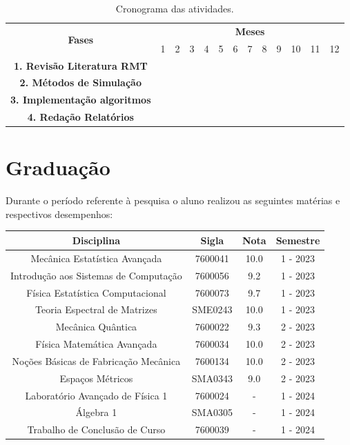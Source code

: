 \documentclass[12pt]{report}
\begin{document}
\begin{table}[ht]
	\centering
	\begin{tabular}{|c|c|c|c|c|c|c|c|c|c|c|c|c|}
		\hline
		\multirow{2}{*}{{\bf Fases}} & \multicolumn{12}{c|}{{\bf Meses}}
		\\ \cline{2-13}
		& 1 & 2 & 3 & 4 & 5 & 6 & 7 & 8 & 9 & 10 & 11 & 12
		\\ \hline
		{\bf 1. Revisão Literatura RMT} & \checkmark & \checkmark & \checkmark & \checkmark & \checkmark & & & & & & &
		\\ \hline
		{\bf 2. Métodos de Simulação} &  &  &  & \checkmark & \checkmark & \checkmark & \checkmark & \checkmark & & & &
		\\ \hline
		{\bf 3. Implementação algoritmos} & & & & & \checkmark & \checkmark & \checkmark & \checkmark & \checkmark & \checkmark & \checkmark &
		\\ \hline
		{\bf 4. Redação Relatórios} & & & & \checkmark & \checkmark & & & & & & \checkmark & \checkmark 
		\\ \hline
	\end{tabular}
	\caption{Cronograma das atividades.}
	\label{tab:cronograma1ano}
\end{table}

\section{Graduação}

Durante o período referente à pesquisa o aluno realizou as seguintes matérias e respectivos desempenhos:
\hspace{1cm}

\begin{center}
	\begin{tabular}{|c|c|c|c|}
		\hline
		Disciplina & Sigla & Nota & Semestre \\
		\hline
		Mecânica Estatística Avançada & 7600041 & 10.0 & 1 - 2023 \\
		\hline
		Introdução aos Sistemas de Computação & 7600056 & 9.2 & 1 - 2023 \\
		\hline
		Física Estatística Computacional & 7600073 & 9.7 & 1 - 2023 \\
		\hline
		Teoria Espectral de Matrizes & SME0243 & 10.0 & 1 - 2023 \\
		\hline
		Mecânica Quântica & 7600022 & 9.3 & 2 - 2023 \\
		\hline
		Física Matemática Avançada & 7600034 & 10.0 & 2 - 2023 \\
		\hline
		Noções Básicas de Fabricação Mecânica & 7600134 & 10.0 & 2 - 2023 \\
		\hline
		Espaços Métricos & SMA0343 & 9.0 & 2 - 2023 \\
		\hline
		Laboratório Avançado de Física 1& 7600024 & - & 1 - 2024 \\
		\hline
		Álgebra 1 & SMA0305 & - & 1 - 2024 \\
		\hline
		Trabalho de Conclusão de Curso & 7600039 & - & 1 - 2024 \\
		\hline
	\end{tabular}
\end{center}
\end{document}
